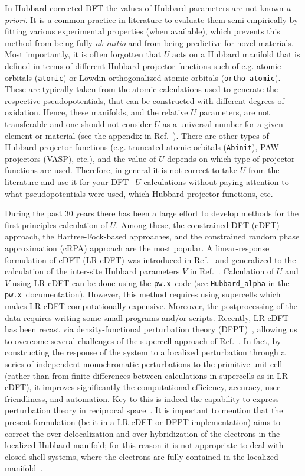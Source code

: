 \documentclass[12pt,a4paper]{article}
\def\pw{\texttt{pw.x}}
\begin{document}
In Hubbard-corrected DFT the values of Hubbard parameters are not known {\it a priori}. It is a common practice in literature to evaluate them semi-empirically by fitting various experimental properties (when available), which prevents this method from being fully {\it ab initio} and from being predictive for novel materials. Most importantly, it is often forgotten that $U$ acts on a Hubbard manifold that is defined in terms of different Hubbard projector functions such of e.g. atomic orbitals (\texttt{atomic}) or L\"owdin orthogonalized atomic orbitals (\texttt{ortho-atomic}). These are typically taken from the atomic calculations used to generate the respective pseudopotentials, that can be constructed with different degrees of oxidation. Hence, these manifolds, and the relative $U$ parameters, are not transferable and one should not consider $U$ as a universal number for a given element or material (see the appendix in Ref.~\cite{Kulik:2008}). There are other types of Hubbard projector functions (e.g. truncated atomic orbitals (\texttt{Abinit}), PAW projectors (VASP), etc.), and the value of $U$ depends on which type of projector functions are used. Therefore, in general it is not correct to take $U$ from the literature and use it for your DFT+$U$ calculations without paying attention to what pseudopotentials were used, which Hubbard projector functions, etc.  

During the past 30 years there has been a large effort to develop methods for the first-principles calculation of $U$. Among these, the constrained DFT (cDFT) approach, the Hartree-Fock-based approaches, and the constrained random phase approximation (cRPA) approach are the most popular. A linear-response formulation of cDFT (LR-cDFT) was introduced in Ref.~\cite{Cococcioni:2005} and generalized to the calculation of the inter-site Hubbard parameters $V$ in Ref.~\cite{Campo:2010}. Calculation of $U$ and $V$ using LR-cDFT can be done using the \pw\ code (see \texttt{Hubbard\_alpha} in the \pw\ documentation). However, this method requires using supercells which makes LR-cDFT computationally expensive. Moreover, the postprocessing of the data requires writing some small programs and/or scripts. Recently, LR-cDFT has been recast via density-functional perturbation theory (DFPT)~\cite{Timrov:2018, Timrov:2021}, allowing us to overcome several challenges of the supercell approach of Ref.~\cite{Cococcioni:2005}. In fact, by constructing the response of the system to a localized perturbation through a series of independent monochromatic perturbations to the primitive unit cell (rather than from finite-differences between calculations in supercells as in LR-cDFT), it improves significantly the computational efficiency, accuracy, user-friendliness, and automation. Key to this is indeed the capability to express perturbation theory in reciprocal space~\cite{Baroni:1987, Giannozzi:1991, Baroni:2001}. It is important to mention that the present formulation (be it in a LR-cDFT or DFPT implementation) aims to correct the over-delocalization and over-hybridization of the electrons in the localized Hubbard manifold; for this reason it is not appropriate to deal with closed-shell systems, where the electrons are fully contained in the localized manifold~\cite{Yu:2014}. 
\end{document}
